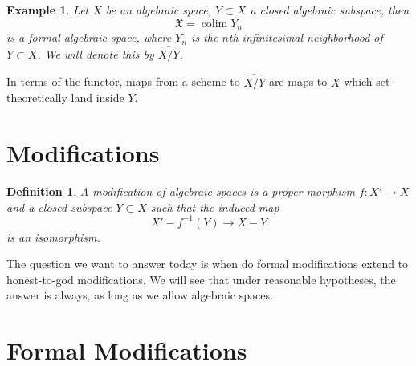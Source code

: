 \documentclass{amsart}
\newtheorem*{defn}{Definition}
\newtheorem*{ex}{Example}
\newcommand{\X}{\mathfrak{X}\xspace}
\DeclareMathOperator{\colim}{colim}
\begin{document}
\begin{ex}
Let $X$ be an algebraic space, $Y \subset X$ a closed algebraic subspace, then \[\X=\colim Y_n\] is a formal algebraic space, where $Y_n$ is the $n$th infinitesimal neighborhood of $Y \subset X$. We will denote this by $\widehat{X/Y}$.
\end{ex}

In terms of the functor, maps from a scheme to $\widehat{X/Y}$ are maps to $X$ which set-theoretically land inside $Y$.

\section{Modifications}

\begin{defn}

A modification of algebraic spaces is a proper morphism $f:X' \to X$ and a closed subspace $Y \subset X$ such that the induced map \[ X'-f^{-1}(Y) \to X-Y \] is an isomorphism.

\end{defn}

The question we want to answer today is when do formal modifications extend to honest-to-god modifications. We will see that under reasonable hypotheses, the answer is always, as long as we allow algebraic spaces.

\section{Formal Modifications}
\end{document}
